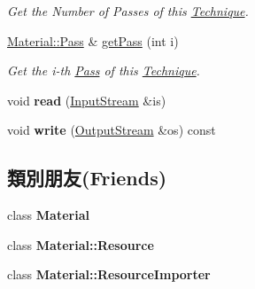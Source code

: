 \begin{DoxyCompactItemize}
\begin{DoxyCompactList}\small\item\em Get the Number of Passes of this \hyperlink{class_i_dream_sky_1_1_material_1_1_technique}{Technique}. \end{DoxyCompactList}\item 
\hyperlink{class_i_dream_sky_1_1_material_1_1_pass}{Material\+::\+Pass} \& \hyperlink{class_i_dream_sky_1_1_material_1_1_technique_a99d7ec03f793832c402a65f11803814a}{get\+Pass} (int i)
\begin{DoxyCompactList}\small\item\em Get the i-\/th \hyperlink{class_i_dream_sky_1_1_material_1_1_pass}{Pass} of this \hyperlink{class_i_dream_sky_1_1_material_1_1_technique}{Technique}. \end{DoxyCompactList}\item 
void {\bfseries read} (\hyperlink{class_i_dream_sky_1_1_input_stream}{Input\+Stream} \&is)\hypertarget{class_i_dream_sky_1_1_material_1_1_technique_a9e226e1b8d586e9a1164f82a5fbb9f66}{}\label{class_i_dream_sky_1_1_material_1_1_technique_a9e226e1b8d586e9a1164f82a5fbb9f66}

\item 
void {\bfseries write} (\hyperlink{class_i_dream_sky_1_1_output_stream}{Output\+Stream} \&os) const \hypertarget{class_i_dream_sky_1_1_material_1_1_technique_a1881316367bc8086d4d58e0a8b34e42b}{}\label{class_i_dream_sky_1_1_material_1_1_technique_a1881316367bc8086d4d58e0a8b34e42b}

\end{DoxyCompactItemize}
\subsection*{類別朋友(Friends)}
\begin{DoxyCompactItemize}
\item 
class {\bfseries Material}\hypertarget{class_i_dream_sky_1_1_material_1_1_technique_aa1212b6e372a0f45d2c01f3cd203af77}{}\label{class_i_dream_sky_1_1_material_1_1_technique_aa1212b6e372a0f45d2c01f3cd203af77}

\item 
class {\bfseries Material\+::\+Resource}\hypertarget{class_i_dream_sky_1_1_material_1_1_technique_a6a002bcee6c883089769545352e9ccbd}{}\label{class_i_dream_sky_1_1_material_1_1_technique_a6a002bcee6c883089769545352e9ccbd}

\item 
class {\bfseries Material\+::\+Resource\+Importer}\hypertarget{class_i_dream_sky_1_1_material_1_1_technique_a941a71e735085112a8496c27836506ee}{}\label{class_i_dream_sky_1_1_material_1_1_technique_a941a71e735085112a8496c27836506ee}

\end{DoxyCompactItemize}


